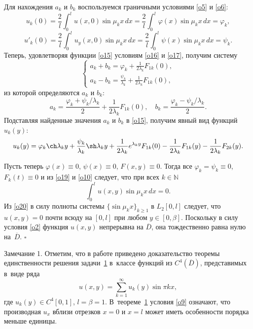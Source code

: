 Для нахождения $a_k$ и $b_k$ воспользуемся граничными условиями \eqref{o5} и \eqref{o6}:
\begin{equation}\label{o16}
u_k(0)=\frac{2}{l}\int _{0}^{l} u(x,0)\sin\mu_kx\,dx=\frac{2}{l}\int _{0}^{l} \varphi(x)\sin\mu_kx\,dx=\varphi_k,
\end{equation}
\begin{equation}\label{o17}
u'_k(0)=\frac{2}{l}\int _{0}^{l} u_y(x,0)\sin\mu_kx\,dx=\frac{2}{l}\int _{0}^{l} \psi(x)\sin\mu_kx\,dx=\psi_k.
\end{equation}
Теперь, удовлетворяя функции \eqref{o15} условиям \eqref{o16} и \eqref{o17}, получим систему
\begin{equation}\label{o18}
\begin{cases}
      \displaystyle a_k+b_k=\varphi_k+\frac{1}{2\lambda_k}F_{1k}(0), \\[2mm]
      \displaystyle a_k-b_k=\frac{\psi_k}{\lambda_k}+\frac{1}{2\lambda_k}F_{1k}(0),
    \end{cases}
\end{equation}
из которой определяются $a_k$ и $b_k$:
$$
a_k=\frac{\varphi_k+\psi_k/\lambda_k}{2}+\frac{1}{2\lambda_k}F_{1k}(0),\quad b_k=\frac{\varphi_k-\psi_k/\lambda_k}{2}.
$$
Подставляя найденные значения $a_k$ и $b_k$ в \eqref{o15}, получим явный вид функций~$u_k(y)$:
\begin{equation}\label{o19}
u_k(y)=\varphi_k\ch\lambda_ky+\frac{\psi_k}{\lambda_k}\sh\lambda_ky+ \frac{1}{2\lambda_k}e^{\lambda_ky}F_{1k}(0)
-\frac{1}{2\lambda_k}F_{1k}(y)- \frac{1}{2\lambda_k}F_{2k}(y).
\end{equation}

Пусть теперь $\varphi(x)\equiv0$, $\psi(x)\equiv0$, $F(x,y)\equiv0$. 
Тогда все $\varphi_k=\psi_k\equiv0$, $F_k(t)\equiv0$ и из \eqref{o19} и \eqref{o10} следует, что при всех $k\in\mathbb{N}$
\begin{equation}\label{o20}
\int _{0}^{l}u(x,y)\sin\mu_kx\,dx=0.
\end{equation}
Из \eqref{o20} в силу полноты системы $\bigl\{\sin\mu_kx\bigr\}_{k\geq1}$ в $L_2[0,l]$ следует, 
что ${u(x,y)=0}$ почти всюду на $[0,l]$ при любом $y\in[0,\beta]$. 
Поскольку в силу условия \eqref{o2} функция $u(x,y)$ непрерывна на $\overline{D}$, она тождественно равна нулю  на~$\overline{D}$.  $\square$

\bigskip


{\small\sc  Замечание 1.} Отметим, что в работе \cite[с. 254--256]{sab:16}  приведено доказательство теоремы единственности решения задачи~\hyperlink{sab:task1}{1} в~классе функций из $C^4(\overline{D})$, представимых в~виде ряда
$$
u(x,y)=\sum\limits_{k=1}^{\infty} u_k(y)\sin{\pi kx},
$$ 
где  $u_k(y)\in C^4[0,1]$, $l=\beta=1$.
В~теореме~\hyperlink{sab:th1}{1} условия \eqref{o9} означают, что производная $u_x$ вблизи отрезков $x=0$ и $x=l$ может иметь особенности порядка меньше единицы.

